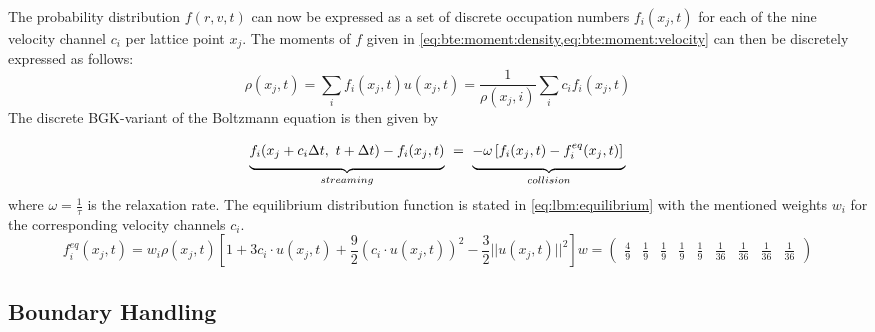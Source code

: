 The probability distribution $f(r,v,t)$ can now be expressed as a set of discrete occupation numbers $f_i(x_j,t)$ for each of the nine velocity channel $c_i$ per lattice point $x_j$. The moments of $f$ given in \cref{eq:bte:moment:density,eq:bte:moment:velocity} can then be discretely expressed as follows:
\begin{subequations}
    \begin{equation}
        \rho(x_j,t) = \sum_i f_i(x_j,t)
        \label{eq:lbm:moment:density}
    \end{equation}
    \begin{equation}
        u(x_j,t) = \frac{1}{\rho(x_j,i)} \sum_i c_i f_i(x_j,t)
        \label{eq:lbm:moment:velocity}
    \end{equation}
    \label{eq:lbm:moment}
\end{subequations}
The discrete BGK-variant of the Boltzmann equation is then given by
\begin{equation}
    \underbrace{f_i(x_j + c_i \Delta t,~ t + \Delta t) - f_i(x_j, t)\vphantom{\frac{1}{2}}}_{streaming} ~=~ \underbrace{-\omega \left[ f_i(x_j,t) - f_i^{eq}(x_j,t) \right]\vphantom{\frac{1}{2}}}_{collision}
    \label{eq:lbm:dicretized}
\end{equation}
where $\omega = \frac{1}{\tau}$ is the relaxation rate. The equilibrium distribution function is stated in \cref{eq:lbm:equilibrium} \cite{mohamad2019} with the mentioned weights $w_i$ for the corresponding velocity channels $c_i$.
\begin{subequations}
    \begin{equation}
        f_i^{eq}(x_j,t) = w_i \rho(x_j,t) \left[ 1 + 3c_i \cdot u(x_j,t) + \frac{9}{2}(c_i \cdot u(x_j,t))^2 - \frac{3}{2} ||u(x_j,t)||^2 \right]
    \end{equation}
    \begin{equation}
        w = \begin{pmatrix}
            \frac{4}{9} & \frac{1}{9} & \frac{1}{9} & \frac{1}{9} & \frac{1}{9} & \frac{1}{36} & \frac{1}{36} & \frac{1}{36} & \frac{1}{36}
        \end{pmatrix}
    \end{equation}
    \label{eq:lbm:equilibrium}
\end{subequations}

\subsection{Boundary Handling}
\label{sec:methods:boundaries}

